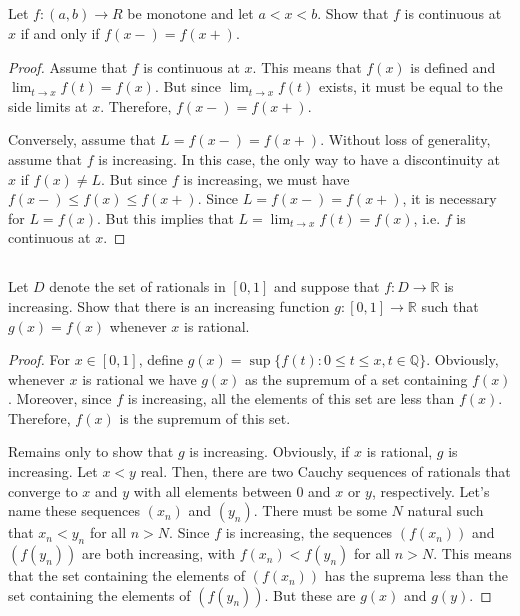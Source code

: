 


\subsection{} Let $f : (a, b) \rightarrow R$ be monotone and let $a < x < b$. Show that $f$ is continuous at $x$ if and only if $f(x-) = f(x+)$.

\begin{proof}
Assume that $f$ is continuous at $x$. This means that $f(x)$ is defined and $\lim_{t\rightarrow x} f(t) = f(x)$. But since $\lim_{t\rightarrow x} f(t)$ exists, it must be equal to the side limits at $x$. Therefore, $f(x-) = f(x+)$.

Conversely, assume that $L = f(x-) = f(x+)$. Without loss of generality, assume that $f$ is increasing. In this case, the only way to have a discontinuity at $x$ if $f(x) \neq L$. But since $f$ is increasing, we must have $f(x-) \leq f(x) \leq f(x+)$. Since $L = f(x-) = f(x+)$, it is necessary for $L=f(x)$. But this implies that $L = \lim_{t\rightarrow x} f(t) = f(x)$, i.e. $f$ is continuous at $x$.
\end{proof}

\subsection{} Let $D$ denote the  set of rationals in $[ 0, 1 ]$  and suppose that  $f  : D \rightarrow \mathbb{R}$ is increasing. Show that there is an increasing function $g : [ 0, 1 ] \rightarrow \mathbb{R}$ such that $g(x) = f(x)$ whenever $x$ is rational. 

\begin{proof}
For $x \in [0, 1]$, define $g(x) = \sup\{f(t) : 0 \leq t \leq x, t \in \mathbb{Q}\}$. Obviously, whenever $x$ is rational we have $g(x)$ as the supremum of a set containing $f(x)$. Moreover, since $f$ is increasing, all the elements of this set are less than $f(x)$. Therefore, $f(x)$ is the supremum of this set.

Remains only to show that $g$ is increasing. Obviously, if $x$ is rational, $g$ is increasing. Let $x<y$ real. Then, there are two Cauchy sequences of rationals that converge to $x$ and $y$ with all elements between $0$ and $x$ or $y$, respectively.  Let's name these sequences $(x_n)$ and $(y_n)$. There must be some $N$ natural such that $x_n < y_n$ for all $n > N$. Since $f$ is increasing, the sequences $(f(x_n))$ and $(f(y_n))$ are both increasing, with $f(x_n) < f(y_n)$ for all $n>N$. This means that the set containing the elements of $(f(x_n))$ has the suprema less than the set containing the elements of $(f(y_n))$. But these are $g(x)$ and $g(y)$.

\end{proof}

